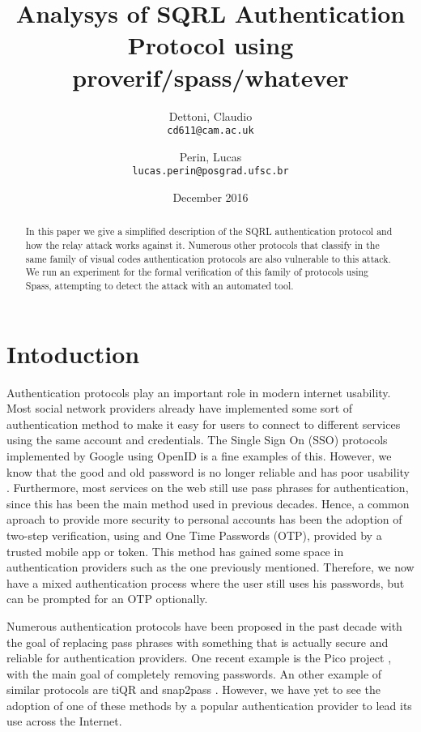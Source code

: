 \documentclass{article}
\title{Analysys of SQRL Authentication Protocol using proverif/spass/whatever}
\author{Dettoni, Claudio\\
	\texttt{cd611@cam.ac.uk}
	\and
	Perin, Lucas\\
	\texttt{lucas.perin@posgrad.ufsc.br}
}
\date{December 2016}
\begin{document}
\maketitle

\begin{abstract}
	In this paper we give a simplified description of the SQRL authentication
	protocol and how the relay attack works against it. Numerous other
	protocols that classify in the same family of visual codes authentication protocols
	are also vulnerable to this attack. We run an experiment for the formal verification of 
	this family of protocols using Spass, attempting to detect the attack with an
	automated tool.
\end{abstract}

\section{Intoduction}
	Authentication protocols play an important role in modern internet
	usability. Most social network providers already have implemented
	some sort of authentication method to make it easy for users to connect
	to different services using the same account and credentials. The Single Sign On 
	(SSO) protocols implemented by Google using OpenID \cite{openid} is a
	fine examples of this. However, we know that the good and 
	old password is no longer reliable and has poor usability \cite{password}.
	Furthermore, most services on the web still use pass phrases for authentication,
	since this has been the main method used in previous decades. Hence,
	a common aproach to provide more security to personal accounts has 
	been the adoption of two-step verification, using and One Time Passwords (OTP),
	provided by a trusted mobile app or token. This	method has gained some 
	space in authentication providers such as the
	one previously mentioned. Therefore, we now have a mixed authentication process
	where the user still uses his passwords, but can be prompted for an
	OTP optionally.

	Numerous authentication protocols have been proposed in the past
	decade with the goal of replacing pass phrases with something that
	is actually secure and reliable for authentication providers. One
	recent example is the Pico project \cite{pico}, with the main goal of
	completely removing passwords. An other example of similar protocols
	are tiQR \cite{tiqr} and snap2pass \cite{snap2pass}.
	However, we have yet to see the adoption of one of these methods
	by a popular authentication provider to lead its use across the
	Internet. 
\end{document}
